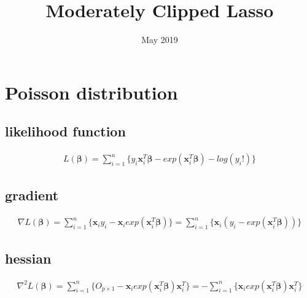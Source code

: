 \documentclass{article}
\title{Moderately Clipped Lasso}
\date{May 2019}
\begin{document}
\maketitle

\section{Poisson distribution}
\subsection{likelihood function}
\begin{eqnarray*}
    L(\bm{\beta}) = \sum_{i=1}^{n}\{y_{i} \bm{x}_{i}^{T}\bm{\beta} - exp(\bm{x}_{i}^{T}\bm{\beta}) - log(y_{i}!)\}
\end{eqnarray*}
   
\subsection{gradient}
\begin{eqnarray*}
    \nabla L(\bm{\beta}) = \sum_{i=1}^{n}\{\bm{x}_{i}y_{i} - \bm{x}_{i}exp(\bm{x}_{i}^{T}\bm{\beta})\}
    = \sum_{i=1}^{n}\{\bm{x}_{i}(y_{i} - exp(\bm{x}_{i}^{T}\bm{\beta}))\}
\end{eqnarray*}
    
\subsection{hessian}
\begin{eqnarray*}
    \nabla^{2} L(\bm{\beta}) = \sum_{i=1}^{n}\{O_{p \times 1} - \bm{x}_{i}exp(\bm{x}_{i}^{T}\bm{\beta})\bm{x}_{i}^{T}\}
    = - \sum_{i=1}^{n}\{\bm{x}_{i}exp(\bm{x}_{i}^{T}\bm{\beta})\bm{x}_{i}^{T}\}
\end{eqnarray*}
\end{document}
